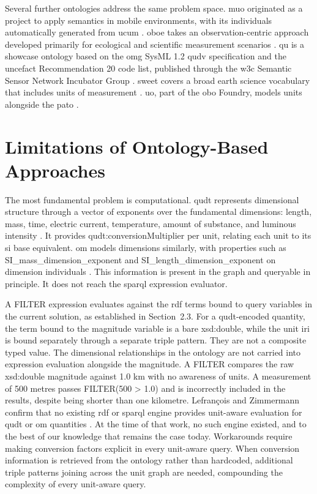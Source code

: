 Several further ontologies address the same problem space. 
\ac{muo} originated as a project to apply semantics in mobile environments, with its individuals automatically generated from \ac{ucum} \cite{keil2018comparison}. 
\ac{oboe} takes an observation-centric approach developed primarily for ecological and scientific measurement scenarios \cite{madin2007ontology}. 
\ac{qu} is a showcase ontology based on the \ac{omg} SysML 1.2 \ac{qudv} specification and the \ac{uncefact} Recommendation 20 code list, published through the \ac{w3c} Semantic Sensor Network Incubator Group \cite{keil2018comparison}. 
\ac{sweet} covers a broad earth science vocabulary that includes units of measurement \cite{raskin2005knowledge}. 
\ac{uo}, part of the \ac{obo} Foundry, models units alongside the \ac{pato} \cite{keil2018comparison}.

\section{Limitations of Ontology-Based Approaches}

The most fundamental problem is computational. 
\ac{qudt} represents dimensional structure through a vector of exponents over the fundamental dimensions: length, mass, time, electric current, temperature, amount of substance, and luminous intensity \cite{hodgson2014quantities}. 
It provides \textsf{qudt:conversionMultiplier} per unit, relating each unit to its \ac{si} base equivalent. 
\ac{om} models dimensions similarly, with properties such as \textsf{SI\_mass\_dimension\_exponent} and \textsf{SI\_length\_dimension\_exponent} on dimension individuals \cite{vanassem2013ontology}. 
This information is present in the graph and queryable in principle. 
It does not reach the \ac{sparql} expression evaluator.

A FILTER expression evaluates against the \ac{rdf} terms bound to query variables in the current solution, as established in Section~2.3. 
For a \ac{qudt}-encoded quantity, the term bound to the magnitude variable is a bare \textsf{xsd:double}, while the unit \ac{iri} is bound separately through a separate triple pattern. 
They are not a composite typed value. 
The dimensional relationships in the ontology are not carried into expression evaluation alongside the magnitude. 
A FILTER compares the raw \textsf{xsd:double} magnitude against 1.0 km with no awareness of units. 
A measurement of 500 metres passes FILTER(500 > 1.0) and is incorrectly included in the results, despite being shorter than one kilometre. 
Lefrançois and Zimmermann confirm that no existing \ac{rdf} or \ac{sparql} engine 
provides unit-aware evaluation for \ac{qudt} or \ac{om} quantities \cite{lefranccois2018unified}. 
At the time of that work, no such engine existed, and to the best of our knowledge 
that remains the case today.
Workarounds require making conversion factors explicit in every unit-aware query. 
When conversion information is retrieved from the ontology rather than hardcoded, additional triple patterns joining across the unit graph are needed, compounding the complexity of every unit-aware query.


